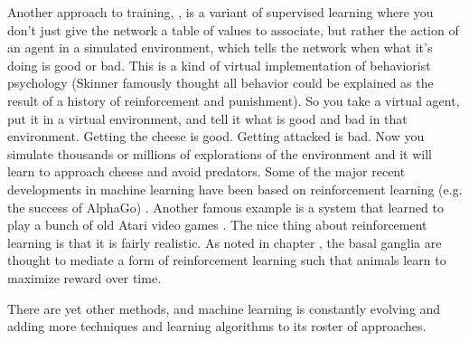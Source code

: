 Another approach to training, , is a variant of supervised learning where you don't just give the network a table of values to associate, but rather the action of an agent in a simulated environment, which tells the network when what it's doing is good or bad. This is a kind of virtual implementation of behaviorist psychology (Skinner famously thought all behavior could be explained as the result of a history of reinforcement and punishment). So you take a virtual agent, put it in a virtual environment, and tell it what  is good and bad in that environment. Getting the cheese is good. Getting attacked is bad. Now you simulate thousands or millions of explorations of the environment and it will learn to approach cheese and avoid predators. Some of the major recent developments in machine learning have been based on reinforcement learning (e.g. the success of AlphaGo) \cite{silver2016mastering}. Another famous example is a system that learned to play a bunch of old Atari video games \cite{mnih2013playing}. The nice thing about reinforcement learning is that it is fairly realistic. As noted in chapter , the basal ganglia are thought to mediate a form of reinforcement learning such that animals learn to maximize reward over time. 

There are yet other methods, and machine learning is constantly evolving and adding more techniques and learning algorithms to its roster of approaches. 

